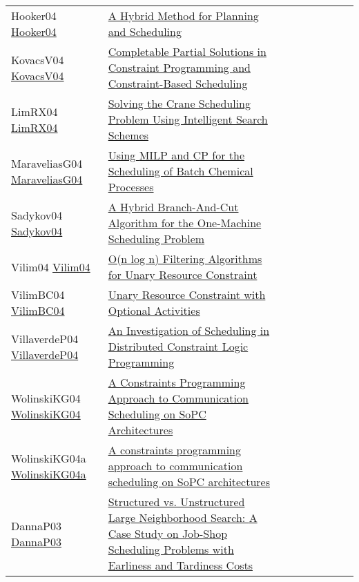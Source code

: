 {\begin{longtable}{p{3cm}p{7cm}lllllll}
Hooker04 \href{https://doi.org/10.1007/978-3-540-30201-8\_24}{Hooker04} &  \href{papers/Hooker04.pdf}{A Hybrid Method for Planning and Scheduling} &  &  &  &  &  &  & \\
KovacsV04 \href{https://doi.org/10.1007/978-3-540-30201-8\_26}{KovacsV04} &  \href{papers/KovacsV04.pdf}{Completable Partial Solutions in Constraint Programming and Constraint-Based Scheduling} &  &  &  &  &  &  & \\
LimRX04 \href{https://doi.org/10.1007/978-3-540-30201-8\_59}{LimRX04} &  \href{papers/LimRX04.pdf}{Solving the Crane Scheduling Problem Using Intelligent Search Schemes} &  &  &  &  &  &  & \\
MaraveliasG04 \href{https://doi.org/10.1007/978-3-540-24664-0\_1}{MaraveliasG04} &  \href{papers/MaraveliasG04.pdf}{Using {MILP} and {CP} for the Scheduling of Batch Chemical Processes} &  &  &  &  &  &  & \\
Sadykov04 \href{https://doi.org/10.1007/978-3-540-24664-0\_31}{Sadykov04} &  \href{papers/Sadykov04.pdf}{A Hybrid Branch-And-Cut Algorithm for the One-Machine Scheduling Problem} &  &  &  &  &  &  & \\
Vilim04 \href{https://doi.org/10.1007/978-3-540-24664-0\_23}{Vilim04} &  \href{papers/Vilim04.pdf}{O(n log n) Filtering Algorithms for Unary Resource Constraint} &  &  &  &  &  &  & \\
VilimBC04 \href{https://doi.org/10.1007/978-3-540-30201-8\_8}{VilimBC04} &  \href{papers/VilimBC04.pdf}{Unary Resource Constraint with Optional Activities} &  &  &  &  &  &  & \\
VillaverdeP04 \href{}{VillaverdeP04} &  \href{}{An Investigation of Scheduling in Distributed Constraint Logic Programming} &  &  &  &  &  &  & \\
WolinskiKG04 \href{https://doi.org/10.1109/DSD.2004.1333291}{WolinskiKG04} &  \href{papers/WolinskiKG04.pdf}{A Constraints Programming Approach to Communication Scheduling on SoPC Architectures} &  &  &  &  &  &  & \\
WolinskiKG04a \href{https://doi.org/10.1145/968280.968336}{WolinskiKG04a} &  \href{}{A constraints programming approach to communication scheduling on SoPC architectures} &  &  &  &  &  &  & \\
DannaP03 \href{https://doi.org/10.1007/978-3-540-45193-8\_59}{DannaP03} &  \href{papers/DannaP03.pdf}{Structured vs. Unstructured Large Neighborhood Search: {A} Case Study on Job-Shop Scheduling Problems with Earliness and Tardiness Costs} &  &  &  &  &  &  & \\

\end{longtable}}
